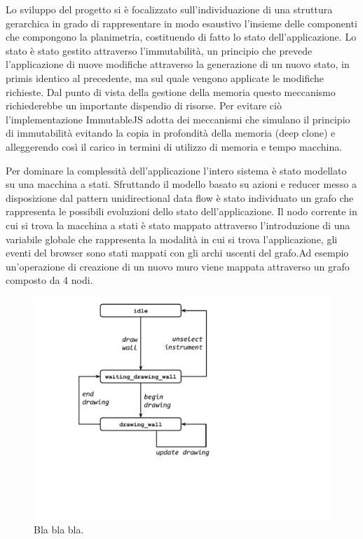 Lo sviluppo del progetto si è focalizzato sull'individuazione di una struttura gerarchica in grado di rappresentare in modo esaustivo l’insieme delle componenti che compongono la planimetria, costituendo di fatto lo stato dell’applicazione. Lo stato è stato gestito attraverso l’immutabilit\`a, un principio che prevede l’applicazione di nuove modifiche attraverso la generazione di un nuovo stato, in primis identico al precedente, ma sul quale vengono applicate le modifiche richieste. Dal punto di vista della gestione della memoria questo meccanismo richiederebbe un importante dispendio di risorse. Per evitare ciò l’implementazione ImmutableJS adotta dei meccanismi che simulano il principio di immutabilit\`a evitando la copia in profondit\`a della memoria  (deep clone) e alleggerendo così il carico in termini di utilizzo di memoria e tempo macchina.


Per dominare la complessit\`a dell’applicazione l’intero sistema è stato modellato su una macchina a stati. Sfruttando il modello basato su azioni e reducer messo a disposizione dal pattern unidirectional data flow è stato individuato un grafo che rappresenta le possibili evoluzioni dello stato dell’applicazione. Il nodo corrente in cui si trova la macchina a stati è stato mappato attraverso l’introduzione di una variabile globale che rappresenta la modalit\`a in cui si trova l’applicazione, gli eventi del browser sono stati mappati con gli archi uscenti del grafo.Ad esempio un’operazione di creazione di un nuovo muro viene mappata attraverso un grafo composto da 4 nodi.\newline

\begin{figure}[!t]
\centering
\includegraphics[width=\linewidth]{contents/images/uc_draw_wall}

\caption{Bla bla bla.}
\label{fig_sim}
\end{figure}


